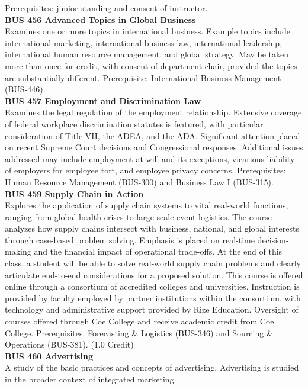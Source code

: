 \documentclass[
  letterpaper,
]{scrbook}
\begin{document}
Prerequisites: junior standing and consent of instructor.\\
\textbf{BUS 456 Advanced Topics in Global Business}\\
Examines one or more topics in international business. Example topics
include international marketing, international business law,
international leadership, international human resource management, and
global strategy. May be taken more than once for credit, with consent of
department chair, provided the topics are substantially different.
Prerequisite: International Business Management (BUS-446).\\
\textbf{BUS 457 Employment and Discrimination Law}\\
Examines the legal regulation of the employment relationship. Extensive
coverage of federal workplace discrimination statutes is featured, with
particular consideration of Title VII, the ADEA, and the ADA.
Significant attention placed on recent Supreme Court decisions and
Congressional responses. Additional issues addressed may include
employment-at-will and its exceptions, vicarious liability of employers
for employee tort, and employee privacy concerns. Prerequisites: Human
Resource Management (BUS-300) and Business Law I (BUS-315).\\
\textbf{BUS 459 Supply Chain in Action}\\
Explores the application of supply chain systems to vital real-world
functions, ranging from global health crises to large-scale event
logistics. The course analyzes how supply chains intersect with
business, national, and global interests through case-based problem
solving. Emphasis is placed on real-time decision-making and the
financial impact of operational trade-offs. At the end of this class, a
student will be able to solve real-world supply chain problems and
clearly articulate end-to-end considerations for a proposed solution.
This course is offered online through a consortium of accredited
colleges and universities. Instruction is provided by faculty employed
by partner institutions within the consortium, with technology and
administrative support provided by Rize Education. Oversight of courses
offered through Coe College and receive academic credit from Coe
College. Prerequisites: Forecasting \& Logistics (BUS-346) and Sourcing
\& Operations (BUS-381). (1.0 Credit)\\
\textbf{BUS 460 Advertising}\\
A study of the basic practices and concepts of advertising. Advertising
is studied in the broader context of integrated marketing
\end{document}
